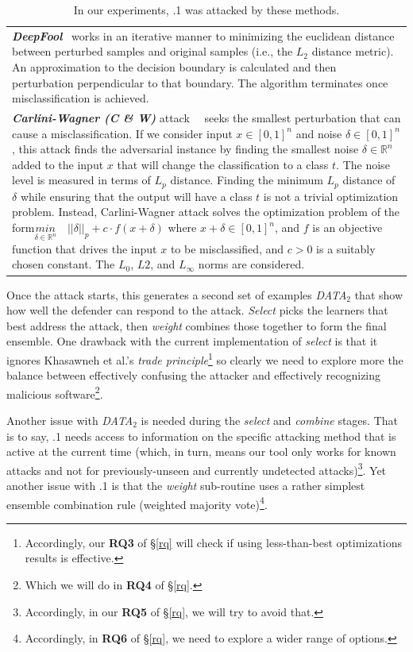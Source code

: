\begin{table}[!t]
\begin{tabular}{|p{\linewidth}|}
\textit{\textbf{DeepFool}}~\cite{moosavi2016deepfool} works in an iterative manner to minimizing the euclidean distance between perturbed samples and original samples (i.e., the $L_{2}$ distance metric). An approximation to the  decision boundary is calculated and then  perturbation perpendicular to that   boundary. The algorithm terminates once misclassification is achieved.\\

\textit{\textbf{Carlini-Wagner (C \& W)}} attack~\cite{carlini2017towards}~\cite{DBLP:conf/ccs/Carlini017} seeks the smallest perturbation that can cause a misclassification. If we consider input $x  \in [0,1]^{n}$ and noise $\delta \in [0,1]^{n}$, this attack finds the adversarial instance by finding the smallest noise $\delta \in \mathbb{R}^{n}$ added to the input $x$ that will change the classification to a class $t$. The noise level is measured in terms of $L_{p}$ distance. Finding the minimum $L_{p}$ distance of $\delta$ while ensuring that the output will have a class $t$ is not a trivial optimization problem. Instead, Carlini-Wagner attack solves the optimization problem of the form$\underset{\delta \in \mathbb{R}^{n}}{min} \quad ||\delta||_{p} + c \cdot f(x + \delta)$
where $x + \delta \in [0,1]^{n}$, and $f$ is an objective function that drives the input $x$ to be misclassified, and $c > 0$ is a suitably chosen constant. The $L_{0}$, $L{2}$, and $L_{\infty}$ norms are considered.
\\\hline
\end{tabular}
\caption{In our experiments, {\IT}.1 was attacked by these methods.}\label{tbl:attack}
\end{table}


\clearpage
Once the attack starts, 
this generates a second set of examples
{\em DATA$_2$} that show how well the defender can respond to the attack.  
{\em Select} picks the learners that best address the attack, then
{\em weight} combines those   together to form the final ensemble.
One drawback with the current implementation of {\em select} is that it ignores 
Khasawneh et al.'s {\em trade principle}\footnote{Accordingly, our   {\bf RQ3}  of \S\ref{rq} will check if using less-than-best optimizations results is effective.}
so clearly we need to explore more the balance between
effectively confusing the attacker and effectively recognizing malicious
software\footnote{Which we will do in {\bf RQ4}  of \S\ref{rq}.}.

Another issue with 
 {\em DATA$_2$}  is needed  during  the {\em select}
and {\em combine} stages. That is to say, {\IT}.1 needs access
to information on the specific
attacking method that is active at the current time (which, in turn,  means our tool only
works for known attacks and not for previously-unseen and currently undetected attacks)\footnote{Accordingly, in our {\bf RQ5}  of \S\ref{rq},
we will try to avoid that.}.
Yet another issue with {\IT}.1 is that the
 {\em weight} sub-routine uses a rather simplest ensemble combination rule (weighted majority vote)\footnote{Accordingly, in   {\bf RQ6}  of \S\ref{rq},
we need to explore a wider range of options.}.

